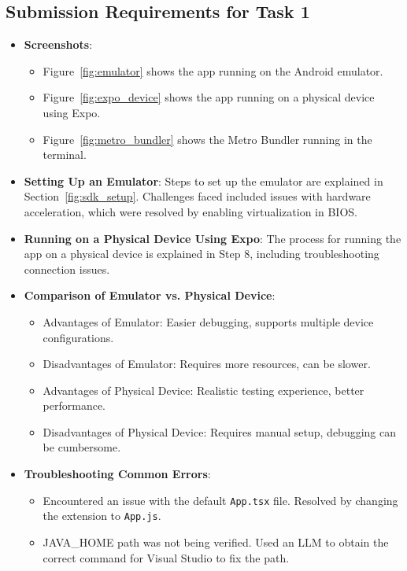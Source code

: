 \documentclass{article}
\begin{document}
\subsection{Submission Requirements for Task 1}
\begin{itemize}
    \item \textbf{Screenshots}: 
    \begin{itemize}
        \item Figure~\ref{fig:emulator} shows the app running on the Android emulator.
        \item Figure~\ref{fig:expo_device} shows the app running on a physical device using Expo.
        \item Figure~\ref{fig:metro_bundler} shows the Metro Bundler running in the terminal.
    \end{itemize}
    \item \textbf{Setting Up an Emulator}: Steps to set up the emulator are explained in Section~\ref{fig:sdk_setup}. Challenges faced included issues with hardware acceleration, which were resolved by enabling virtualization in BIOS.
    \item \textbf{Running on a Physical Device Using Expo}: The process for running the app on a physical device is explained in Step 8, including troubleshooting connection issues.
    \item \textbf{Comparison of Emulator vs. Physical Device}: 
    \begin{itemize}
        \item Advantages of Emulator: Easier debugging, supports multiple device configurations.
        \item Disadvantages of Emulator: Requires more resources, can be slower.
        \item Advantages of Physical Device: Realistic testing experience, better performance.
        \item Disadvantages of Physical Device: Requires manual setup, debugging can be cumbersome.
    \end{itemize}
    \item \textbf{Troubleshooting Common Errors}: 
    \begin{itemize}
        \item Encountered an issue with the default \texttt{App.tsx} file. Resolved by changing the extension to \texttt{App.js}.
        \item JAVA\_HOME path was not being verified. Used an LLM to obtain the correct command for Visual Studio to fix the path.
    \end{itemize}
\end{itemize}
\end{document}
